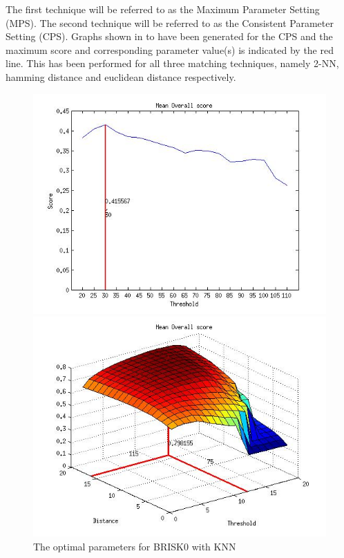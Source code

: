 \documentclass{article}
\begin{document}
The first technique will be referred to as the Maximum Parameter Setting (MPS). The second technique will be referred to as the Consistent Parameter Setting (CPS). Graphs shown in  to  have been generated for the CPS and the maximum score and corresponding parameter value(s) is indicated by the red line. This has been performed for all three matching techniques, namely 2-NN, hamming distance and euclidean distance respectively.\\


\begin{figure}
\begin{minipage}[b]{0.5\linewidth}
\includegraphics[scale=0.5]{../Drawings/OptimalParameters_SBRISK_SBRISK_KNN.jpg}
\caption{The optimal parameters for BRISK0 with KNN}
\label{fig:BRISK0knnOptimal}
\end{minipage}
\hspace{0.5cm}
\begin{minipage}[b]{0.5\linewidth}
\includegraphics[scale=0.5]{../Drawings/OptimalParameters_SBRISK_SBRISK_hamming.jpg}

\end{minipage}
\end{figure}
\end{document}
